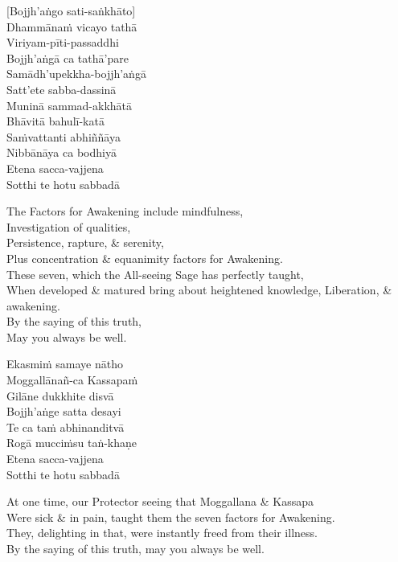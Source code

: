 \vspace{-0.6em}

[Bojjh'aṅgo sati-saṅkhāto]\\
Dhammānaṁ vicayo tathā\\
Viriyam-pīti-passaddhi\\
Bojjh'aṅgā ca tathā'pare\\
Samādh'upekkha-bojjh'aṅgā\\
Satt'ete sabba-dassinā\\
Muninā sammad-akkhātā\\
Bhāvitā bahulī-katā\\
Saṁvattanti abhiññāya\\
Nibbānāya ca bodhiyā\\
Etena sacca-vajjena\\
Sotthi te hotu sabbadā

\begin{english-verses}
  The Factors for Awakening include mindfulness,\\
  Investigation of qualities,\\
  Persistence, rapture, \& serenity,\\
  Plus concentration \& equanimity factors for Awakening.\\
  These seven, which the All-seeing Sage has perfectly taught,\\
  When developed \& matured bring about heightened knowledge, Liberation, \& awakening.\\
  By the saying of this truth,\\
  May you always be well.
\end{english-verses}

Ekasmiṁ samaye nātho\\
Moggallānañ-ca Kassapaṁ\\
Gilāne dukkhite disvā\\
Bojjh'aṅge satta desayi\\
Te ca taṁ abhinanditvā\\
Rogā mucciṁsu taṅ-khaṇe\\
Etena sacca-vajjena\\
Sotthi te hotu sabbadā

\begin{english-verses}
  At one time, our Protector seeing that Moggallana \& Kassapa\\
  Were sick \& in pain, taught them the seven factors for Awakening.\\
  They, delighting in that, were instantly freed from their illness.\\
  By the saying of this truth, may you always be well.
\end{english-verses}

